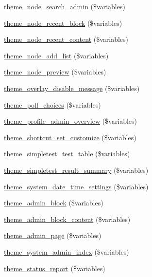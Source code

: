 \begin{DoxyCompactItemize}
\hyperlink{group__themeable_ga047126c1afd64a21474b5c8d1da35e00}{theme\_\-node\_\-search\_\-admin} (\$variables)
\item 
\hyperlink{group__themeable_gabb27be326bca09218e6e44048127c8e3}{theme\_\-node\_\-recent\_\-block} (\$variables)
\item 
\hyperlink{group__themeable_ga97f48d53d3d8c179a80d67fe24a85a55}{theme\_\-node\_\-recent\_\-content} (\$variables)
\item 
\hyperlink{group__themeable_gab493e4a21e1f9653a52edf932492f6f6}{theme\_\-node\_\-add\_\-list} (\$variables)
\item 
\hyperlink{group__themeable_ga1a03fc98e8ba251ec4b971a27b615f09}{theme\_\-node\_\-preview} (\$variables)
\item 
\hyperlink{group__themeable_ga2f95531a7317b7c7ed20e9e7ac411793}{theme\_\-overlay\_\-disable\_\-message} (\$variables)
\item 
\hyperlink{group__themeable_ga1959b73825b215f08bf6e91d5b9f66b4}{theme\_\-poll\_\-choices} (\$variables)
\item 
\hyperlink{group__themeable_ga8ae065d1df5f313b0701ec6af07d7b05}{theme\_\-profile\_\-admin\_\-overview} (\$variables)
\item 
\hyperlink{group__themeable_ga09ee7cf1498bdf9d44c787179a9c24c8}{theme\_\-shortcut\_\-set\_\-customize} (\$variables)
\item 
\hyperlink{group__themeable_gaed0609b7e410d8c7d4588da68d7a6db9}{theme\_\-simpletest\_\-test\_\-table} (\$variables)
\item 
\hyperlink{group__themeable_ga2d5ee334c73f279fb02e602ae8bf5edc}{theme\_\-simpletest\_\-result\_\-summary} (\$variables)
\item 
\hyperlink{group__themeable_ga1d104bb4af90ef4212f7fb5c545ded92}{theme\_\-system\_\-date\_\-time\_\-settings} (\$variables)
\item 
\hyperlink{group__themeable_ga8b1a3d4767adfca752cb2d3b92b3f20b}{theme\_\-admin\_\-block} (\$variables)
\item 
\hyperlink{group__themeable_ga464c24771bc0b172bbee22ba7184b65d}{theme\_\-admin\_\-block\_\-content} (\$variables)
\item 
\hyperlink{group__themeable_gaea8c6bf86d9f3e2cb91cca0edfa80d2c}{theme\_\-admin\_\-page} (\$variables)
\item 
\hyperlink{group__themeable_gacd2298d618d9cadea5727104a81ef499}{theme\_\-system\_\-admin\_\-index} (\$variables)
\item 
\hyperlink{group__themeable_gad147c4639b7e85af6e3dcd3dc347366c}{theme\_\-status\_\-report} (\$variables)

\end{DoxyCompactItemize}

